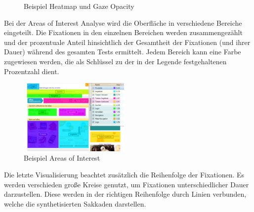 \begin{figure}[H] 
	\centering
	\hspace{1.0em}
	\caption[Beispiel Heatmap und Gaze Opacity]{Beispiel Heatmap und Gaze Opacity \cite{Henrici2010}}
	\label{fig:heatmapGazeOpacity}
\end{figure}
Bei der Areas of Interest Analyse wird die Oberfläche in verschiedene Bereiche eingeteilt. Die Fixationen in den einzelnen Bereichen werden zusammengezählt und der prozentuale Anteil hinsichtlich der Gesamtheit der Fixationen (und ihrer Dauer) während des gesamten Tests ermittelt. Jedem Bereich kann eine Farbe zugewiesen werden, die als Schlüssel zu der in der Legende festgehaltenen Prozentzahl dient.
\begin{figure}[H]
 \centering
 \includegraphics[width=0.48\textwidth]{grafiken/areas_of_interest.png}
 \caption[Beispiel Areas of Interest]{Beispiel Areas of Interest \cite{Henrici2010}}
 \label{fig:areasOfInterest}
\end{figure}
Die letzte Visualisierung beachtet zusätzlich die Reihenfolge der Fixationen. Es werden verschieden große Kreise genutzt, um Fixationen unterschiedlicher Dauer darzustellen. Diese werden in der richtigen Reihenfolge durch Linien verbunden, welche die synthetisierten Sakkaden darstellen.
